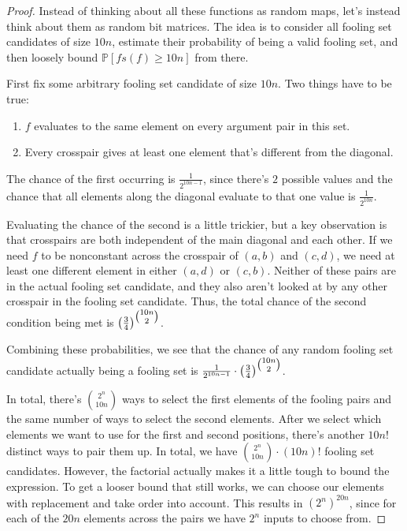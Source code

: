 \documentclass[letterpaper]{article}
\begin{document}
\begin{proof}
    Instead of thinking about all these functions as random maps,
    let's instead think about them as random bit matrices.
    The idea is to consider all fooling set candidates of size $10n$,
    estimate their probability of being a valid fooling set,
    and then loosely bound $\mathbb{P}[fs(f) \ge 10n]$ from there.

    First fix some arbitrary fooling set candidate of size $10n$.
    Two things have to be true:
    \begin{enumerate}
        \item $f$ evaluates to the same element on every argument pair in this set.
        \item Every crosspair gives at least one element that's different from the diagonal.
    \end{enumerate}
    The chance of the first occurring is $\frac{1}{2^{10n-1}}$,
    since there's $2$ possible values and the chance that all elements
    along the diagonal evaluate to that one value is $\frac{1}{2^{10n}}$.

    Evaluating the chance of the second is a little trickier,
    but a key observation is that crosspairs are both independent of the main
    diagonal and each other.
    If we need $f$ to be nonconstant across the crosspair of $(a, b)$ and $(c, d)$,
    we need at least one different element in either $(a, d)$ or $(c, b)$.
    Neither of these pairs are in the actual fooling set candidate,
    and they also aren't looked at by any other crosspair in the fooling set candidate.
    Thus, the total chance of the second condition being met is
    $\left(\frac{3}{4}\right)^{\tbinom{10n}{2}}$.

    Combining these probabilities, we see that the chance of any random
    fooling set candidate actually being a fooling set is
    $\frac{1}{2^{10n-1}} \cdot \left(\frac{3}{4}\right)^{\tbinom{10n}{2}}$.

    In total, there's $\binom{2^n}{10n}$ ways to select the first elements
    of the fooling pairs and the same number of ways to select the second elements.
    After we select which elements we want to use for the first and second positions,
    there's another $10n!$ distinct ways to pair them up.
    In total, we have $\binom{2^n}{10n} \cdot (10n)!$ fooling set candidates.
    However, the factorial actually makes it a little tough to bound the expression.
    To get a looser bound that still works, we can choose our elements with
    replacement and take order into account.
    This results in $\left(2^n\right)^{20n}$, since for each of the $20n$ elements
    across the pairs we have $2^n$ inputs to choose from.


\end{proof}
\end{document}
